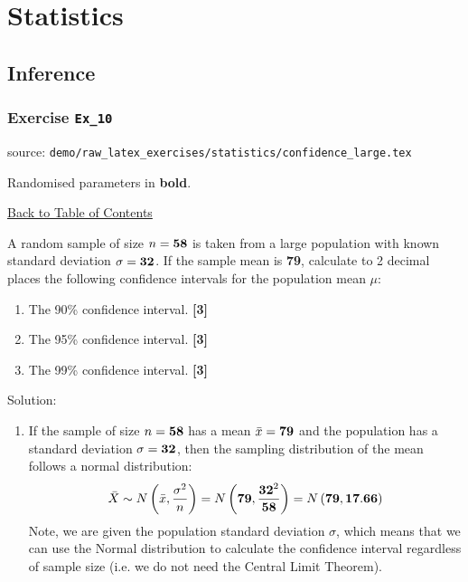 \documentclass[a4paper, leqno, 12pt]{report}
\newenvironment{top_enumerate}{
\begin{enumerate}
  \setlength{\itemsep}{2em}
  \setlength{\topsep}{-0pt}
  \setlength{\partopsep}{-0pt}
}{\end{enumerate}}
\begin{document}
\chapter{Statistics}
\section{Inference}
\subsection{Exercise \texttt{Ex\_10}}
source: \texttt{demo/raw\_latex\_exercises/statistics/confidence\_large.tex}

Randomised parameters in \textbf{bold}. 

\hyperlink{contents}{Back to Table of Contents}
\begin{top_enumerate}
\item A random sample of size $n={\bf 58}$ is taken from a large population with known standard deviation $\sigma = {\bf 32}$. If the sample mean is {\bf 79}, calculate to 2 decimal places the following confidence intervals for the population mean $\mu$:
 
\setcounter{equation}{0}  %
\begin{enumerate}
	\setlength{\topsep}{-0pt}
	\setlength{\partopsep}{-0pt}
	\setlength{\itemsep}{10pt}
			\item The 90\% confidence interval.
	 \quad \textbf{[3]}
		\item The 95\% confidence interval.
	 \quad \textbf{[3]}
		\item The 99\% confidence interval.
	 \quad \textbf{[3]}
\end{enumerate}\addtocounter{enumi}{-1}
\item Solution:
 
\setcounter{equation}{0}  %
\begin{enumerate}
	\setlength{\topsep}{-0pt}
	\setlength{\partopsep}{-0pt}
	\setlength{\itemsep}{10pt}
			\item If the sample of size $n={\bf 58}$ has a mean $\bar x = {\bf 79}$ and the population has a standard deviation $\sigma={\bf 32}$, then the sampling distribution of the mean follows a normal distribution:
	\[
	\bar X \sim N \left(\bar x,\frac{\sigma^2}{n}\right) = N \left({\bf 79},\frac{{\bf 32}^2}{{\bf 58}}\right) = N \left({\bf 79},{\bf 17.66}\right)
	\]
	Note, we are given the population standard deviation $\sigma$, which means that we can use the Normal distribution to calculate the confidence interval regardless of sample size (i.e. we do not need the Central Limit Theorem).
	

\end{enumerate}
\end{top_enumerate}
\end{document}
